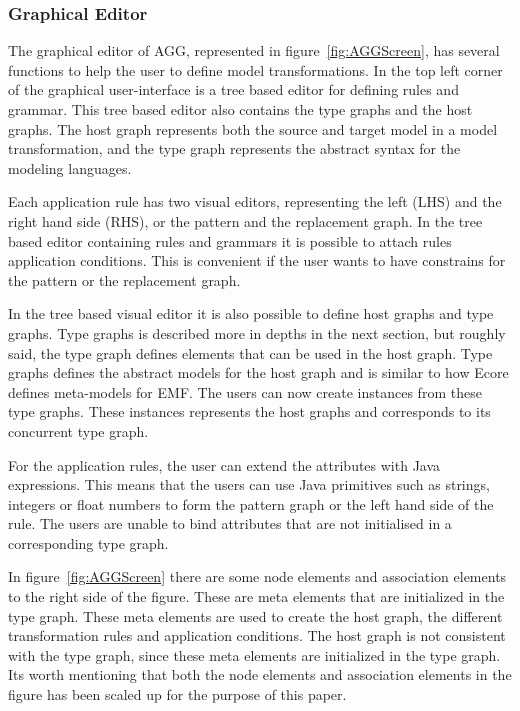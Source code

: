 \subsubsection*{Graphical Editor}
The graphical editor of AGG, represented in figure~\ref{fig:AGGScreen}, has
several functions to help the user to define model transformations. In the top
left corner of the graphical user-interface is a tree based editor for defining
rules and grammar. This tree based editor also contains the type graphs and the
host graphs. The host graph represents both the source and target model in
a model transformation, and the type graph represents the abstract syntax for
the modeling languages. 

Each application rule has two visual editors, representing the left
(LHS) and the right hand side (RHS), or the pattern and the replacement graph.
In the tree based editor containing rules and grammars it is possible to attach
rules application conditions. This is convenient if the user wants to have
constrains for the pattern or the replacement graph.

In the tree based visual editor it is also possible to define host
graphs and type graphs. Type graphs is described more in depths in the next
section, but roughly said, the type graph defines elements that can be used in
the host graph. Type graphs defines the abstract models for the host graph and
is similar to how Ecore defines meta-models for EMF. The users can now create
instances from these type graphs. These instances represents the host graphs
and corresponds to its concurrent type graph.

For the application rules, the user can extend the attributes with Java
expressions. This means that the users can use Java primitives such as strings,
integers or float numbers to form the pattern graph or the left hand side of
the rule. The users are unable to bind attributes that are not initialised
in a corresponding type graph.

In figure~\ref{fig:AGGScreen} there are some node elements and association
elements to the right side of the figure. These are meta elements that are
initialized in the type graph. These meta elements are used to create the host
graph, the different transformation rules and application conditions. The host
graph is not consistent with the type graph, since these meta elements are
initialized in the type graph. Its worth mentioning that both the
node elements and association elements in the figure has been scaled up for the
purpose of this paper.

